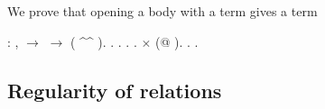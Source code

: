 \documentclass[12pt]{report}
\begin{document}
We prove that opening a body with a term gives a term \begin{coqdoccode}
\coqdocemptyline
\coqdocnoindent
{}  : \coqdockw{\ensuremath{\forall}}  ,\coqdoceol
\coqdocindent{1.00em}
  \ensuremath{\rightarrow}   \ensuremath{\rightarrow}  ( \^{}\^{} ).\coqdoceol
\coqdocnoindent
{}.\coqdoceol
\coqdocindent{1.00em}
.  .  . \ensuremath{\times} (@ ).\coqdoceol
\coqdocnoindent
{}.\coqdoceol
\coqdocemptyline
\coqdocnoindent
{} .\coqdoceol
\coqdocemptyline
\end{coqdoccode}
\subsection{Regularity of relations}
\end{document}

